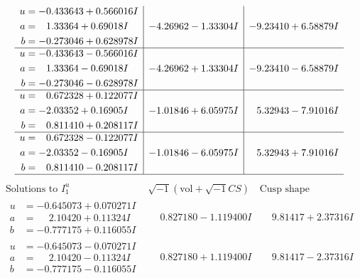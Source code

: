 \documentclass[1p]{elsarticle_modified}
\theoremstyle{definition}
\newcommand{\I}{\sqrt{-1}}
\begin{document}
$$\begin{array}{c|c|c}
\begin{aligned}
u &= -0.433643 + 0.566016 I \\
a &= \phantom{-}1.33364 + 0.69018 I \\
b &= -0.273046 + 0.628978 I\end{aligned}
 & -4.26962 - 1.33304 I & -9.23410 + 6.58879 I \\ \hline\begin{aligned}
u &= -0.433643 - 0.566016 I \\
a &= \phantom{-}1.33364 - 0.69018 I \\
b &= -0.273046 - 0.628978 I\end{aligned}
 & -4.26962 + 1.33304 I & -9.23410 - 6.58879 I \\ \hline\begin{aligned}
u &= \phantom{-}0.672328 + 0.122077 I \\
a &= -2.03352 + 0.16905 I \\
b &= \phantom{-}0.811410 + 0.208117 I\end{aligned}
 & -1.01846 + 6.05975 I & \phantom{-}5.32943 - 7.91016 I \\ \hline\begin{aligned}
u &= \phantom{-}0.672328 - 0.122077 I \\
a &= -2.03352 - 0.16905 I \\
b &= \phantom{-}0.811410 - 0.208117 I\end{aligned}
 & -1.01846 - 6.05975 I & \phantom{-}5.32943 + 7.91016 I\\
 \hline 
 \end{array}$$\newpage$$\begin{array}{c|c|c}  
\text{Solutions to }I^u_{1}& \I (\text{vol} + \sqrt{-1}CS) & \text{Cusp shape}\\
 \hline 
\begin{aligned}
u &= -0.645073 + 0.070271 I \\
a &= \phantom{-}2.10420 + 0.11324 I \\
b &= -0.777175 + 0.116055 I\end{aligned}
 & \phantom{-}0.827180 - 1.119400 I & \phantom{-}9.81417 + 2.37316 I \\ \hline\begin{aligned}
u &= -0.645073 - 0.070271 I \\
a &= \phantom{-}2.10420 - 0.11324 I \\
b &= -0.777175 - 0.116055 I\end{aligned}
 & \phantom{-}0.827180 + 1.119400 I & \phantom{-}9.81417 - 2.37316 I \\ \hline\begin{aligned}

\end{aligned}
\end{array}$$
\end{document}
